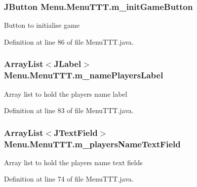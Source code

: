 \subsubsection[{m\+\_\+init\+Game\+Button}]{\setlength{\rightskip}{0pt plus 5cm}J\+Button Menu.\+Menu\+T\+T\+T.\+m\+\_\+init\+Game\+Button\hspace{0.3cm}{\ttfamily [private]}}\label{class_menu_1_1_menu_t_t_t_a59b7acc44f8e856bd54c46a8c81b1990}
Button to initialise game 

Definition at line 86 of file Menu\+T\+T\+T.\+java.

\hypertarget{class_menu_1_1_menu_t_t_t_a3a18e1c57089dedf1bdb8808affb405b}{}
\subsubsection[{m\+\_\+name\+Players\+Label}]{\setlength{\rightskip}{0pt plus 5cm}Array\+List$<$J\+Label$>$ Menu.\+Menu\+T\+T\+T.\+m\+\_\+name\+Players\+Label\hspace{0.3cm}{\ttfamily [private]}}\label{class_menu_1_1_menu_t_t_t_a3a18e1c57089dedf1bdb8808affb405b}
Array list to hold the players name label 

Definition at line 83 of file Menu\+T\+T\+T.\+java.

\hypertarget{class_menu_1_1_menu_t_t_t_a2398e606664e494a0bfd92cd4990404f}{}
\subsubsection[{m\+\_\+players\+Name\+Text\+Field}]{\setlength{\rightskip}{0pt plus 5cm}Array\+List$<$J\+Text\+Field$>$ Menu.\+Menu\+T\+T\+T.\+m\+\_\+players\+Name\+Text\+Field\hspace{0.3cm}{\ttfamily [private]}}\label{class_menu_1_1_menu_t_t_t_a2398e606664e494a0bfd92cd4990404f}
Array list to hold the player\textquotesingle{}s name text fields 

Definition at line 74 of file Menu\+T\+T\+T.\+java.

\hypertarget{class_menu_1_1_menu_t_t_t_a1f431306714855f214aacab632031a23}{}
